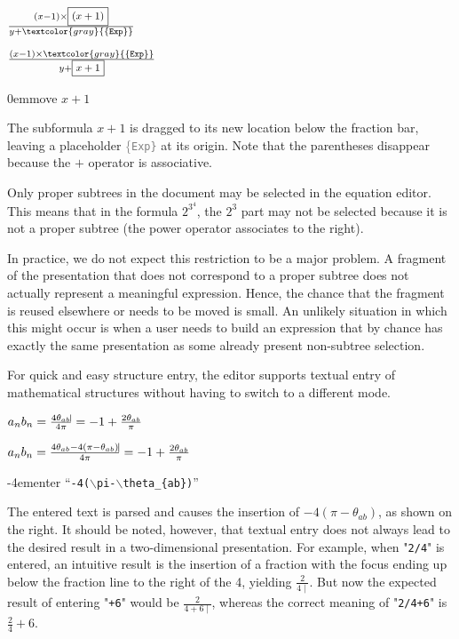 \documentclass{speauth}
\begin{document}
\editStepScrshot
{$ \frac{(x-1)\times{ \framebox{\scriptsize $(x+1)$}}}{y + \textcolor{gray}{\{\tt Exp\}}}    $}
{\begin{normalsize}$ \frac{(x-1)\times{\textcolor{gray}{\{\tt Exp\}}} }{y + \framebox{\scriptsize $x+1$}}{\vrule height1.8ex width-2.5pt depth1.99ex} $ \end{normalsize}}
{0em}{\small move $x+1$}

The subformula $x+1$ is dragged to its new location below the fraction bar, leaving a placeholder \textcolor{gray}{\{\tt Exp\}} at its origin. Note that the parentheses disappear because the $+$ operator is associative. 

Only proper subtrees in the document may be selected in the equation editor. This means that in the formula $2^{3^4}$, 
the $2^3$ part may not be selected because it is not a proper subtree (the power operator associates to the right). 

In practice, we do not expect this restriction to be a major problem. A fragment of the presentation that does not correspond to a proper subtree does not actually represent a meaningful expression. Hence, the chance that the fragment is reused elsewhere or needs to be moved is small. An unlikely situation in which this might occur is when a user needs to build an expression that by chance has exactly the same presentation as some already present non-subtree selection.


For quick and easy structure entry, the editor supports textual entry of mathematical structures without having to switch to a different mode.


\editStepScrshot
{\begin{normalsize}$a_nb_n = \frac{4\theta_{ab}\vline}{4\pi } = -1 + \frac{2\theta_{ab}}{\pi}$ \end{normalsize}}
{\begin{normalsize}$a_nb_n = \frac{4\theta_{ab} - 4(\pi - \theta_{ab})\vline}{4\pi } = -1 + \frac{2\theta_{ab}}{\pi}$ \end{normalsize}}
{-4em}{\small enter  ``{\tt -4($\backslash$pi-$\backslash$theta\_\{ab\})}'' }



The entered text is parsed and causes the insertion of $- 4(\pi - \theta_{ab})$, as shown on the right.  It should be noted, however, that textual entry does not always lead to the desired result in a two-dimensional presentation. For example, when "\verb|2/4|" is entered, an intuitive result is the insertion of a fraction with the focus ending up below the fraction line to the right of the 4, yielding {$\frac{2}{4\mid}$}. But now the expected result of entering "\verb|+6|" would be {$\frac{2}{4+6\mid}$}, whereas the correct meaning of "\verb|2/4+6|" is $\frac{2}{4}+6$.
\end{document}
